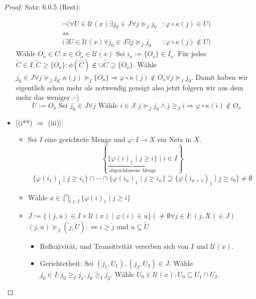 \begin{proof}{Satz: 6.0.5 (Rest):}
\begin{itemize}
    \begin{equation*}
    \begin{split}
    \lnot (\forall U \in \mathscr{U}(x) \exists j_0 \in J \forall j \succeq_J j_0 &:
    \varphi \circ\kappa(j) \in U)\\
    \Leftrightarrow&\\
    (\exists U \in \mathscr{U}(x) \forall j_0 \in J \exists j \succeq_J j_0 &:
    \varphi \circ \kappa(j) \notin U)
    \end{split}
    \end{equation*}
    Wähle $O_o \in C: x \in O_o \in \mathscr{U}(x)$
    Sei $i_o := \{O_o\}\in I_o$. Für jedes $\tilde{C} \in I, \tilde{C} \geq \{O_o\}: 
    \phi(\tilde{C}) \notin \cup \tilde{C} \supseteq \{O_o\}$.
    Wähle $j_0 \in J \forall j \succeq_J j_0 : \kappa(j) \succeq_I \{O_o\} \Rightarrow
    \varphi \circ \kappa(j) \notin O_o \forall j \succeq_J j_0$.
    Damit haben wir eigentlich schon mehr als notwendig gezeigt also jetzt folgern
    wir aus dem mehr das weniger :-)
    $$
    U:= O_o \text{ Sei } j_0 \in J \forall j \text{ Wähle } i \in J : j \succeq_J j_0 \wedge j \geq_J i
    \Rightarrow \varphi \circ \kappa(i) \notin O_o
    $$
    \item{[(i**) $\Rightarrow$ (iii)]}:
    \begin{itemize}
    \item Sei $I$ eine gerichtete Menge und 
    $\varphi : I \to X$ ein Netz in $X$.
    $$
    \left
    \{\underbrace{ \{ \varphi(i)_1 \mid j \ge i \}}_{\text{abgeschlossene Menge}} \mid i \in I 
    \right\}
    $$
    $$
    \{ \varphi(i_1)_1 \mid j \geq i_1 \} \cap \cdots \cap \{ \varphi(i_n)_1 \mid j \geq i_n \}
    \supseteq
    \{ \varphi(i_{n+1})_1 \mid j \geq i_{0} \} \ne \emptyset
    $$
    \item Wähle $x \in \bigcap_{i \in I} \overline{\{ \varphi(i)_1 \mid j \geq i \}}$
    \item $J := \{(j,u) \in I \times \mathscr{U}(x) \mid \varphi(i) \in u \} (\neq \emptyset 
    \forall j \in I: (j,X)\in J)$
    $(j,u) \succeq_J (\tilde{j},\tilde{U}): \Leftrightarrow i \geq \tilde{j} \text{ und } u 
    \subseteq \tilde{U}$
    \begin{itemize}
        \item Reflexivität, und Transitivität vererben sich von $I$ und $\mathscr{U}(x)$.
        \item Gerichtetheit: Sei $(j_1, U_1), (j_2, U_2) \in J$.
        Wähle $j_0 \in I : j_0 \geq_I j_1, j_0 \geq_I j_2$.
        Wähle $U_0 \in \mathscr{U}(x) : U_0 \subseteq U_1 \cap U_2$.

\end{itemize}
\end{itemize}
\end{itemize}
\end{proof}

